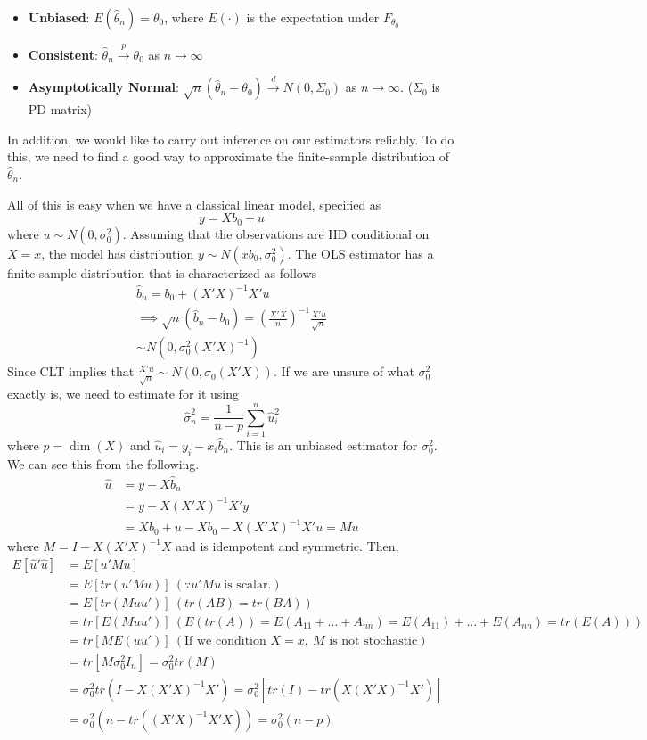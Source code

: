 \begin{itemize}
\item \textbf{Unbiased}: $E(\hat{\theta}_n)=\theta_0$, where $E(\cdot)$ is the expectation under $F_{\theta_0}$
\item \textbf{Consistent}: $\hat{\theta}_n\xrightarrow{p} \theta_0$ as $n\to\infty$
\item \textbf{Asymptotically Normal}: $\sqrt{n}(\hat{\theta}_n-\theta_0) \xrightarrow{d} N(0,\Sigma_0)$ as $n\to\infty$. ($\Sigma_0$ is PD matrix)
\end{itemize}
In addition, we would like to carry out inference on our estimators reliably. To do this, we need to find a good way to approximate the finite-sample distribution of $\hat{\theta}_n$. \par
All of this is easy when we have a classical linear model, specified as 
\[
y=Xb_0+u
\]
where $u\sim N(0,\sigma_0^2)$. Assuming that the observations are IID conditional on $X=x$, the model has distribution $y\sim N(xb_0,\sigma_0^2)$. The OLS estimator has a finite-sample distribution that is characterized as follows
\begin{gather*}
\hat{b}_n = b_0 + (X'X)^{-1}X'u\\
\implies \sqrt{n}(\hat{b}_n-b_0)=\left(\frac{X'X}{n}\right)^{-1}\frac{X'u}{\sqrt{n}}\\
\sim N(0,\sigma_0^2(X'X)^{-1})
\end{gather*}
Since CLT implies that $\frac{X'u}{\sqrt{n}}\sim N(0,\sigma_0(X'X))$. If we are unsure of what $\sigma_0^2$ exactly is, we need to estimate for it using
\[
\hat{\sigma}_n^2 = \frac{1}{n-p}\sum_{i=1}^n \hat{u}_i^2
\]
where $p=\dim(X)$ and $\hat{u}_i = y_i - x_i\hat{b}_n$. This is an unbiased estimator for $\sigma_0^2$. We can see this from the following.
\begin{align*}
\hat{u} &= y-X\hat{b}_n\\
&=y-X(X'X)^{-1}X'y\\
&=Xb_0+u-Xb_0-X(X'X)^{-1}X'u = Mu 
\end{align*}
where $M=I-X(X'X)^{-1}X$ and is idempotent and symmetric. Then, 
\begin{align*}
E[\hat{u}'\hat{u}]&=E[u'Mu]\\
&=E[tr(u'Mu)] \ (\because u'Mu \ \text{is scalar.})\\
&=E[tr(Muu')] \ (tr(AB)=tr(BA))\\
&=tr[E(Muu')] \ (E(tr(A)) =E(A_{11}+...+A_{nn})=E(A_{11})+...+E(A_{nn})=tr(E(A)))\\
&=tr[ME(uu')] \ (\text{If we condition }X=x,\ \text{$M$ is not stochastic})\\
&=tr[M \sigma_0^2 I_n] = \sigma_0^2 tr(M)\\
&=\sigma_0^2 tr(I-X(X'X)^{-1}X')=\sigma_0^2[tr(I)-tr(X(X'X)^{-1}X')]\\
&=\sigma_0^2(n-tr((X'X)^{-1}X'X)) = \sigma_0^2(n-p)
\end{align*}
